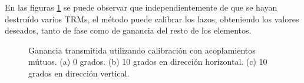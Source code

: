 En las figuras \ref{fig:deadTRMsMutual} se puede observar que independientemente de que se hayan destruído varios TRMs, el 
método puede calibrar los lazos, obteniendo los valores deseados, tanto de fase como de ganancia del resto de los elementos.
\begin{figure}[H]
	\centering
 	
		\caption{Ganancia transmitida utilizando calibración con acoplamientos mútuos. (a) 0 grados. (b) 10 grados en 
		dirección horizontal. (c) 10 grados en dirección vertical.}
	\label{fig:deadTRMsMutual}
\end{figure}
